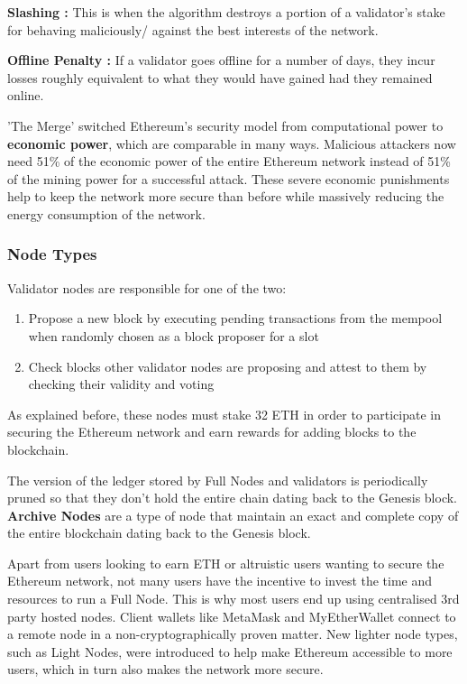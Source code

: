 \textbf{Slashing :}
This is when the algorithm destroys a portion of a validator's stake for behaving maliciously/ against the best interests of the network.

\textbf{Offline Penalty :}
If a validator goes offline for a number of days, they incur losses roughly equivalent to what they would have gained had they remained online. 

'The Merge' switched Ethereum's security model from computational power to \textbf{economic power}, which are comparable in many ways. Malicious attackers now need 51\% of the economic power of the entire Ethereum network instead of 51\% of the mining power for a successful attack. These severe economic punishments help to keep the network more secure than before while massively reducing the energy consumption of the network. 



\subsubsection{Node Types}

Validator nodes are responsible for one of the two:
\begin{enumerate}
    \item Propose a new block by executing pending transactions from the mempool when randomly chosen as a block proposer for a slot
    \item Check blocks other validator nodes are proposing and attest to them by checking their validity and voting 
\end{enumerate}
As explained before, these nodes must stake 32 ETH in order to participate in securing the Ethereum network and earn rewards for adding blocks to the blockchain.

The version of the ledger stored by Full Nodes and validators is periodically pruned so that they don't hold the entire chain dating back to the Genesis block. \textbf{Archive Nodes} are a type of node that maintain an exact and complete copy of the entire blockchain dating back to the Genesis block. 

Apart from users looking to earn ETH or altruistic users wanting to secure the Ethereum network, not many users have the incentive to invest the time and resources to run a Full Node. This is why most users end up using centralised 3rd party hosted nodes. Client wallets like MetaMask and MyEtherWallet connect to a remote node in a non-cryptographically proven matter. New lighter node types, such as Light Nodes, were introduced to help make Ethereum accessible to more users, which in turn also makes the network more secure.


